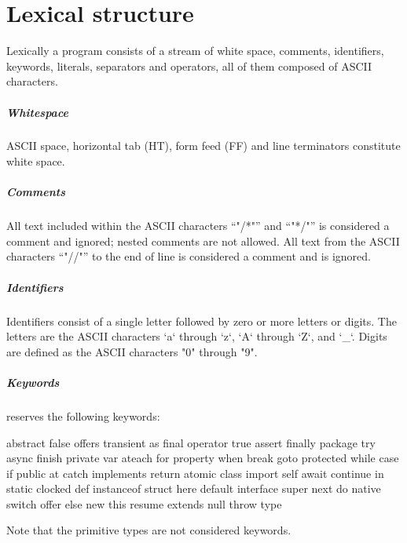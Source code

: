 \chapter{Lexical structure}


Lexically a program consists of a stream of white space, comments,
identifiers, keywords, literals, separators and operators, all of them
composed of ASCII characters. 

\paragraph{Whitespace}
ASCII space, horizontal tab (HT), form feed (FF) and line
terminators constitute white space.

\paragraph{Comments}
All text included within the ASCII characters ``\xcd"/*"'' and
``\xcd"*/"'' is
considered a comment and ignored; nested comments are not
allowed.  All text from the ASCII characters
``\xcd"//"'' to the end of line is considered a comment and is ignored.

\paragraph{Identifiers}

Identifiers consist of a single letter followed by zero or more
letters or digits.
The letters are the ASCII characters \xcd`a` through \xcd`z`, \xcd`A` through
\xcd`Z`, and \xcd`_`.
Digits are defined as the ASCII characters \xcd"0" through \xcd"9".

\paragraph{Keywords}
\Xten{} reserves the following keywords:
\begin{xten}
abstract       false          offers         transient      
as             final          operator       true           
assert         finally        package        try            
async          finish         private        var            
ateach         for            property       when           
break          goto           protected      while          
case           if             public         at             
catch          implements     return         atomic         
class          import         self           await          
continue       in             static         clocked        
def            instanceof     struct         here           
default        interface      super          next           
do             native         switch         offer          
else           new            this           resume         
extends        null           throw          type           
\end{xten}
Note that the primitive types are not considered keywords.

